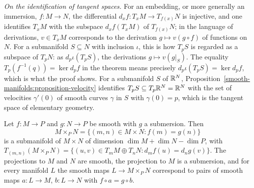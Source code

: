 \emph{On the identification of tangent spaces.} For an embedding, or more generally an immersion, $f \colon M \to N$, the differential $d_xf \colon T_xM \to T_{f(x)}N$ is injective, and one
identifies $T_xM$ with the subspace $d_xf(T_xM)$ of $T_{f(x)}N$; in the language of derivations, $v \in T_xM$ corresponds to the derivation $g \mapsto v(g \circ f)$ of functions on $N$. For a
submanifold $S \subseteq N$ with inclusion $\iota$, this is how $T_pS$ is regarded as a subspace of $T_pN$: as $d_p\iota(T_pS)$, the derivations $g \mapsto v(g|_S)$. The equality
$T_p(f^{-1}(q)) = \ker d_pf$ in the theorem means precisely $d_p\iota(T_pS) = \ker d_pf$, which is what the proof shows. For a submanifold $S$ of $\mathbb{R}^N$, Proposition~\ref{smooth-manifolds:proposition-velocity}
identifies $T_pS \subseteq T_p\mathbb{R}^N = \mathbb{R}^N$ with the set of velocities $\gamma'(0)$ of smooth curves $\gamma$ in $S$ with $\gamma(0) = p$, which is the tangent
space of elementary geometry.

\begin{proposition}\label{smooth-manifolds:proposition-fibre-product}
Let $f \colon M \to P$ and $g \colon N \to P$ be smooth with $g$ a submersion. Then
\[
M \times_PN = \{(m, n) \in M \times N : f(m) = g(n)\}
\]
is a submanifold of $M \times N$ of dimension $\dim M + \dim N - \dim P$, with
$T_{(m,n)}(M \times_PN) = \{(u, v) \in T_mM \oplus T_nN : d_mf(u) = d_ng(v)\}$. The projections to $M$ and $N$ are smooth, the projection to $M$ is a submersion,
and for every manifold $L$ the smooth maps $L \to M \times_PN$ correspond to pairs of smooth maps $a \colon L \to M$, $b \colon L \to N$ with $f \circ a = g \circ b$.
\end{proposition}

